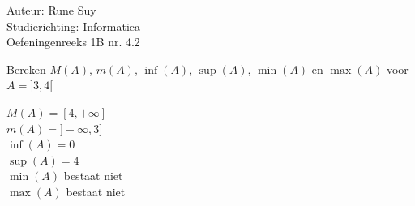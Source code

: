 \documentclass[a4paper]{article}
\begin{document}
  
\noindent \large Auteur: Rune Suy \\
\noindent \large Studierichting: Informatica\\
\noindent \large Oefeningenreeks 1B nr. 4.2\\

\medskip

\normalsize

Bereken $M(A)$, $m(A)$, $\inf(A)$, $\sup(A)$, $\min(A)$ en $\max(A)$ voor $A=]3, 4[$\\

\medskip

$M(A) = [4, +\infty]$\\

$m(A) = ]-\infty, 3]$\\

$\inf(A) = 0$\\

$\sup(A)= 4$\\

$\min(A) $ bestaat niet\\

$\max(A) $ bestaat niet\\
\end{document}
